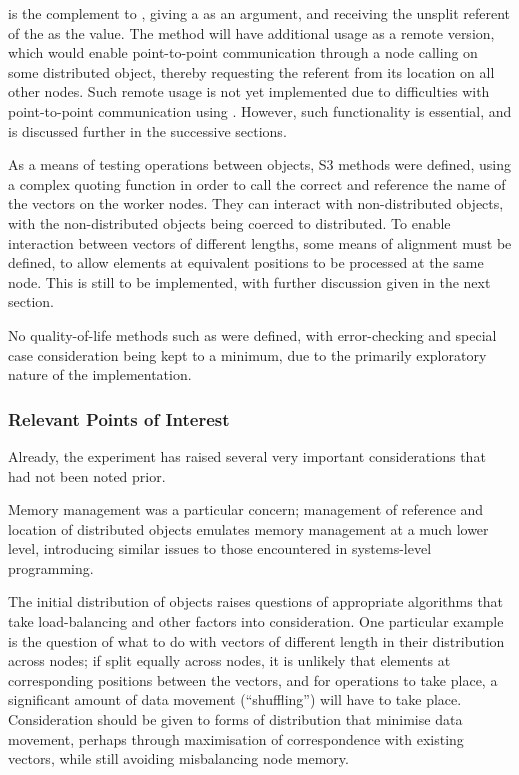  is the complement to , giving a
 as an argument, and receiving the unsplit
referent of the  as the value. The method
will have additional usage as a remote version, which would enable
point-to-point communication through a node calling  on
some distributed object, thereby requesting the referent from its
location on all other nodes. Such remote usage is not yet implemented
due to difficulties with point-to-point communication using .
However, such functionality is essential, and is discussed further in
the successive sections.

As a means of testing operations between 
objects, S3  methods were defined, using a complex quoting
function in order to call the correct  and reference
the name of the vectors on the worker nodes. They can interact with
non-distributed objects, with the non-distributed objects being coerced
to distributed. To enable interaction between vectors of different
lengths, some means of alignment must be defined, to allow elements at
equivalent positions to be processed at the same node. This is still to
be implemented, with further discussion given in the next section.

No quality-of-life methods such as  were defined, with
error-checking and special case consideration being kept to a minimum,
due to the primarily exploratory nature of the implementation.

\subsubsection{Relevant Points of Interest}\label{relevant-points-of-interest}

Already, the experiment has raised several very important considerations
that had not been noted prior.

Memory management was a particular concern; management of reference and
location of distributed objects emulates memory management at a much
lower level, introducing similar issues to those encountered in
systems-level programming.

The initial distribution of objects raises questions of appropriate
algorithms that take load-balancing and other factors into
consideration. One particular example is the question of what to do with
vectors of different length in their distribution across nodes; if split
equally across nodes, it is unlikely that elements at corresponding
positions between the vectors, and for operations to take place, a
significant amount of data movement (``shuffling'') will have to take
place. Consideration should be given to forms of distribution that
minimise data movement, perhaps through maximisation of correspondence
with existing vectors, while still avoiding misbalancing node memory.

